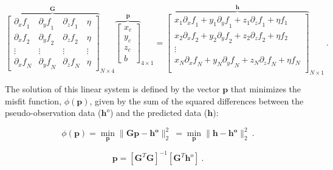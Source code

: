    \begin{equation}
    {\overbrace{
    \begin{bmatrix}
      {\partial_x f}_1 & {\partial_y f}_1 & {\partial_z f}_1 & \eta \\
      {\partial_x f}_2 & {\partial_y f}_2 & {\partial_z f}_2 & \eta \\
      \vdots & \vdots & \vdots & \vdots \\
      {\partial_x f}_N & {\partial_y f}_N & {\partial_z f}_N & \eta
    \end{bmatrix}
    }^{\mathbf{G}}}_{N \times 4}
    {\overbrace{
    \begin{bmatrix}
      x_c \\ y_c \\ z_c \\ b
    \end{bmatrix}
    }^{\mathbf{p}}}_{4 \times 1}
    =
    {\overbrace{
    \begin{bmatrix}
      x_1 {\partial_x f}_1 + y_1 {\partial_y f}_1 + z_1 {\partial_z f}_1 + \eta f_1 \\
      x_2 {\partial_x f}_2 + y_2 {\partial_y f}_2 + z_2 {\partial_z f}_2 + \eta f_2 \\
      \vdots \\
      x_N {\partial_x f}_N + y_N {\partial_y f}_N + z_N {\partial_z f}_N + \eta f_N \\
    \end{bmatrix}
    }^{\mathbf{h}}}_{N \times 1}
    \ .
    \end{equation}
    
    The solution of this linear system is defined by the vector $\mathbf{p}$ that minimizes the misfit function, $\phi(\mathbf{p})$, given by the sum of the squared differences between the pseudo-observation data ($\mathbf{h}^o$) and the predicted data ($\mathbf{h}$):
    
    \begin{equation}
    \label{function_phi}
    \phi(\mathbf{p}) = \min_{\mathbf{p}} \| \mathbf{G}\mathbf{p} - \mathbf{\mathbf{h}^o} \|_2^2\ = \min_{\mathbf{p}} \| \mathbf{h} - \mathbf{\mathbf{h}^o} \|_2^2\
    .
    \end{equation}
    
    
    \begin{equation}
    \label{euler_solution}
    \mathbf{p} = {[\mathbf{G}^T \mathbf{G}]}^{-1} [\mathbf{G}^T \mathbf{h}^o]\ .
    \end{equation}
    
